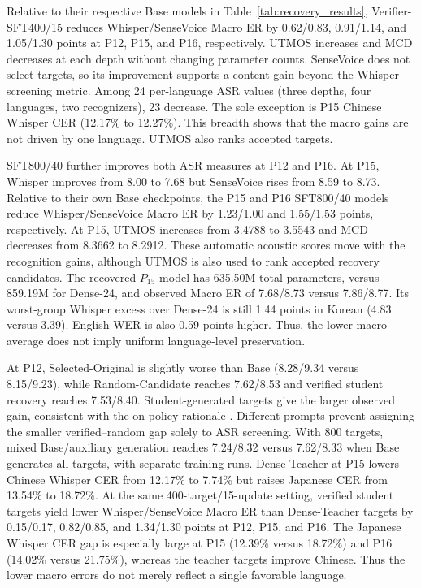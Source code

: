 \documentclass{article}
\begin{document}
Relative to their respective Base models in
Table~\ref{tab:recovery_results}, Verifier-SFT400/15 reduces
Whisper/SenseVoice Macro ER by 0.62/0.83, 0.91/1.14, and 1.05/1.30
points at P12, P15, and P16, respectively. UTMOS increases and MCD
decreases at each depth without changing parameter counts. SenseVoice
does not select targets, so its improvement supports a content gain
beyond the Whisper screening metric. Among 24 per-language ASR values
(three depths, four languages, two recognizers), 23 decrease. The sole
exception is P15 Chinese Whisper CER (12.17\% to 12.27\%). This breadth
shows that the macro gains are not driven by one language. UTMOS also
ranks accepted targets.

SFT800/40 further improves both ASR measures at P12 and P16. At P15,
Whisper improves from 8.00 to 7.68 but SenseVoice rises from 8.59 to
8.73. Relative to their own Base checkpoints, the P15 and P16
SFT800/40 models reduce Whisper/SenseVoice Macro ER by
1.23/1.00 and 1.55/1.53 points, respectively.
At P15, UTMOS increases from 3.4788 to 3.5543 and
MCD decreases from 8.3662 to 8.2912. These automatic acoustic scores
move with the recognition gains, although UTMOS is also used to rank
accepted recovery candidates. The recovered \(P_{15}\) model has
635.50M total parameters, versus 859.19M for Dense-24, and observed
Macro ER of 7.68/8.73 versus 7.86/8.77. Its worst-group Whisper
excess over Dense-24 is still 1.44 points in Korean (4.83 versus
3.39). English WER is also 0.59 points higher. Thus, the lower macro
average does not imply uniform language-level preservation.

At P12, Selected-Original is slightly worse than Base (8.28/9.34
versus 8.15/9.23), while Random-Candidate reaches 7.62/8.53 and
verified student recovery reaches 7.53/8.40. Student-generated targets
give the larger observed gain, consistent with the on-policy rationale
\cite{agarwal2024onpolicy}. Different prompts prevent assigning the
smaller verified--random gap solely to ASR screening. With 800 targets,
mixed Base/auxiliary generation reaches 7.24/8.32 versus 7.62/8.33
when Base generates all targets, with separate training runs.
Dense-Teacher at P15 lowers Chinese Whisper CER from 12.17\% to 7.74\%
but raises Japanese CER from 13.54\% to 18.72\%. At the same 400-target/15-update setting, verified student targets
yield lower Whisper/SenseVoice Macro ER than Dense-Teacher targets by
0.15/0.17, 0.82/0.85, and 1.34/1.30 points at P12, P15, and P16. The Japanese
Whisper CER gap is especially large at P15 (12.39\% versus 18.72\%)
and P16 (14.02\% versus 21.75\%), whereas the teacher targets improve
Chinese. Thus the lower macro errors do not merely reflect a single
favorable language.
\end{document}
